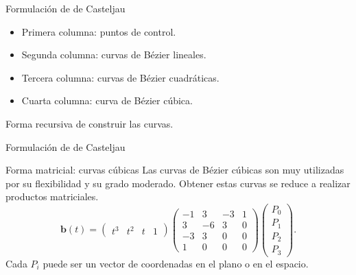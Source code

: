 \documentclass[original_version/main.tex]{subfiles}
\begin{document}
\begin{frame}[t]{Formulación de de Casteljau}
\begin{minipage}[t]{\textwidth}\begin{center}\end{center}\end{minipage}\small\begin{itemize}
\item Primera columna: puntos de control.
\item Segunda columna: curvas de Bézier lineales.
\item Tercera columna: curvas de Bézier cuadráticas.
\item Cuarta columna: curva de Bézier cúbica.
\end{itemize}Forma recursiva de construir las curvas.
\end{frame}

\begin{frame}[t]{Formulación de de Casteljau}
\end{frame}

\begin{frame}[t]{Forma matricial: curvas cúbicas}
\small Las curvas de Bézier cúbicas son muy utilizadas por su flexibilidad y su grado moderado. Obtener estas curvas se reduce a realizar productos matriciales.\[\mathbf b(t)=\begin{pmatrix}t^3&t^2&t&1\end{pmatrix}\begin{pmatrix}-1&3&-3&1\\3&-6&3&0\\-3&3&0&0\\1&0&0&0\end{pmatrix}\begin{pmatrix}P_0\\P_1\\P_2\\P_3\end{pmatrix}.\]\medskip Cada $P_i$ puede ser un vector de coordenadas en el plano o en el espacio.
\end{frame}
\end{document}
